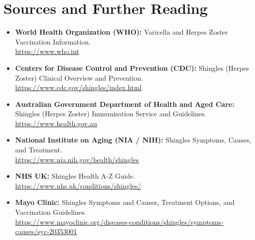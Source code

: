 \section*{Sources and Further Reading}
\begin{itemize}
    \item \textbf{World Health Organization (WHO):} Varicella and Herpes Zoster Vaccination Information. \\
    \url{https://www.who.int}
    \item \textbf{Centers for Disease Control and Prevention (CDC):} Shingles (Herpes Zoster) Clinical Overview and Prevention. \\
    \url{https://www.cdc.gov/shingles/index.html}
    \item \textbf{Australian Government Department of Health and Aged Care:} Shingles (Herpes Zoster) Immunisation Service and Guidelines. \\
    \url{https://www.health.gov.au}
    \item \textbf{National Institute on Aging (NIA / NIH):} Shingles Symptoms, Causes, and Treatment. \\
    \url{https://www.nia.nih.gov/health/shingles}
    \item \textbf{NHS UK:} Shingles Health A-Z Guide. \\
    \url{https://www.nhs.uk/conditions/shingles/}
    \item \textbf{Mayo Clinic:} Shingles Symptoms and Causes, Treatment Options, and Vaccination Guidelines. \\
    \url{https://www.mayoclinic.org/diseases-conditions/shingles/symptoms-causes/syc-20353001}
\end{itemize}